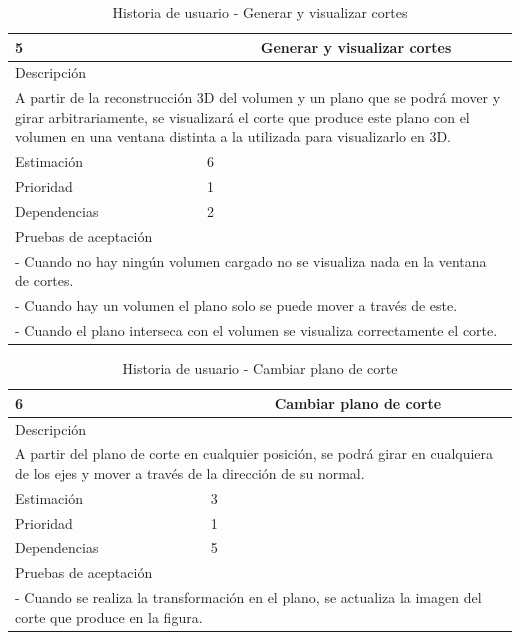 \begin{table}[H]
	\begin{center}
		\begin{tabular} {|l|c|l|}
			\hline
			5 & \multicolumn{2}{c|}{Generar y visualizar cortes} \\ \hline \hline
			\multicolumn{3}{|l|}{Descripción} \\ \hline
			\multicolumn{3}{|p{12cm}|}{A partir de la reconstrucción 3D del volumen y un plano que se podrá mover y girar arbitrariamente, se visualizará el corte que produce este plano con el volumen en una ventana distinta a la utilizada para visualizarlo en 3D.} \\ \hline
			\multicolumn{2}{|l|}{Estimación} & 6 \\ \hline
			\multicolumn{2}{|l|}{Prioridad} & 1 \\ \hline
			\multicolumn{2}{|l|}{Dependencias} & 2 \\ \hline
			\multicolumn{3}{|l|}{Pruebas de aceptación} \\ \hline
			\multicolumn{3}{|p{12cm}|}{ - Cuando no hay ningún volumen cargado no se visualiza nada en la ventana de cortes.} \\ 
			\multicolumn{3}{|p{12cm}|}{ - Cuando hay un volumen el plano solo se puede mover a través de este.} \\ 
			\multicolumn{3}{|p{12cm}|}{ - Cuando el plano interseca con el volumen se visualiza correctamente el corte.} \\ \hline
		\end{tabular}
	\end{center}
	\caption{Historia de usuario - Generar y visualizar cortes}
	\label{tab:hu_generar_y_visualizar_cortes}
\end{table}

\begin{table}[H]
	\begin{center}
		\begin{tabular} {|l|c|l|}
			\hline
			6 & \multicolumn{2}{c|}{Cambiar plano de corte} \\ \hline \hline
			\multicolumn{3}{|l|}{Descripción} \\ \hline
			\multicolumn{3}{|p{12cm}|}{A partir del plano de corte en cualquier posición, se podrá girar en cualquiera de los ejes y mover a través de la dirección de su normal.} \\ \hline
			\multicolumn{2}{|l|}{Estimación} & 3 \\ \hline
			\multicolumn{2}{|l|}{Prioridad} & 1 \\ \hline
			\multicolumn{2}{|l|}{Dependencias} & 5 \\ \hline
			\multicolumn{3}{|l|}{Pruebas de aceptación} \\ \hline
			\multicolumn{3}{|p{12cm}|}{ - Cuando se realiza la transformación en el plano, se actualiza la imagen del corte que produce en la figura.} \\ \hline
		\end{tabular}
	\end{center}
	\caption{Historia de usuario - Cambiar plano de corte}
	\label{tab:hu_cambiar_plano_de_corte}
\end{table}

